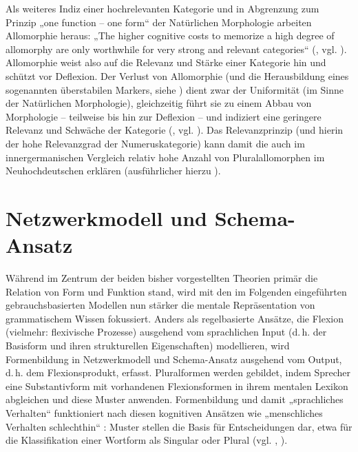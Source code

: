 Als weiteres Indiz einer hochrelevanten Kategorie und in Abgrenzung zum Prinzip „one function -- one form“ der Natürlichen Morphologie arbeiten \citet{DammelNübling2006} Allomorphie heraus: „The higher cognitive costs to memorize a high degree of allomorphy are only worthwhile for very strong and relevant categories“ (\citealt[110]{DammelNübling2006}, vgl. \citealt[368]{Kürschner2008a}). Allomorphie weist also auf die Relevanz und Stärke einer Kategorie hin und schützt vor Deflexion. Der Verlust von Allomorphie (und die Herausbildung eines sogenannten überstabilen Markers, siehe ) dient zwar der Uniformität (im Sinne der Natürlichen Morphologie), gleichzeitig führt sie zu einem Abbau von Morphologie -- teilweise bis hin zur Deflexion -- und indiziert eine geringere Relevanz und Schwäche der Kategorie (\citealt[100]{DammelNübling2006}, vgl. \citealt[368]{Kürschner2008a}). Das Relevanzprinzip (und hierin der hohe Relevanzgrad der Numeruskategorie) kann damit die auch im innergermanischen Vergleich relativ hohe Anzahl von Plural\-allomorphen im Neuhochdeutschen erklären (ausführlicher hierzu \citealt{DammelEtAl2010}).

\section{Netzwerkmodell und Schema-Ansatz}
\label{sec:5.3}
Während im Zentrum der beiden bisher vorgestellten Theorien primär die Relation von Form und Funktion stand, wird mit den im Folgenden eingeführten gebrauchsbasierten Modellen nun stärker die mentale Repräsentation von grammatischem Wissen fokussiert. Anders als regelbasierte Ansätze, die Flexion (vielmehr: flexivische Prozesse) ausgehend vom sprachlichen Input (d.\,h. der Basisform und ihren strukturellen Eigenschaften) modellieren, wird Formenbildung in  Netzwerkmodell und  Schema-Ansatz ausgehend vom Output, d.\,h. dem Flexionsprodukt, erfasst. Pluralformen werden gebildet, indem Sprecher eine Substantivform mit vorhandenen Flexionsformen in ihrem mentalen Lexikon abgleichen und diese Muster anwenden. Formenbildung und damit „sprachliches Verhalten“ funktioniert nach diesen kognitiven Ansätzen wie „menschliches Verhalten schlechthin“ \citep[71]{Köpcke1993}: Muster stellen die Basis für Entscheidungen dar, etwa für die Klassifikation einer Wortform als Singular oder Plural (vgl. \citealt[453]{Bybee1995}, \citealt[267]{BybeeModer1983}).

